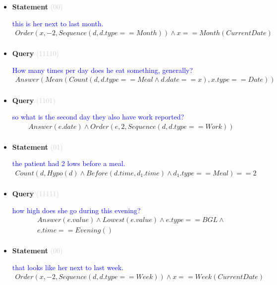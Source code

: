 \documentclass[11pt]{article}
\newcommand{\key}[1]{\textcolor{lightgray}{#1}}
\newcounter{CQuery}
\newcounter{CStatement}
\begin{document}
\begin{itemize}
\item
\textbf{Statement\theCStatement} \key{(00)} \addtocounter{CStatement}{1}
\textcolor{blue}{ this is her next to last month. }
\begin{multline*}
Order(x, -2, Sequence(d, d.type==Month)) \wedge x==Month(CurrentDate) \\ 
\end{multline*}


\item
\textbf{Query\theCQuery} \key{(11110)} \addtocounter{CQuery}{1}
\textcolor{blue}{ How many times per day does he eat something, generally? }
\begin{multline*}
Answer(Mean(Count(d, d.type==Meal \wedge d.date==x), x.type==Date)) \\ 
\end{multline*}


\item
\textbf{Query\theCQuery} \key{(1101)} \addtocounter{CQuery}{1}
\textcolor{blue}{ so what is the second day they also have work reported? }
\begin{multline*}
Answer(e.date) \wedge Order(e, 2, Sequence(d, d.type==Work)) \\ 
\end{multline*}


\item
\textbf{Statement\theCStatement} \key{(01)} \addtocounter{CStatement}{1}
\textcolor{blue}{ the patient had 2 lows before a meal. }
\begin{multline*}
Count(d, Hypo(d) \wedge Before(d.time, d_1.time) \wedge d_1.type==Meal)==2 \\ 
\end{multline*}


\item
\textbf{Query\theCQuery} \key{(11111)} \addtocounter{CQuery}{1}
\textcolor{blue}{ how high does she go during this evening? }
\begin{multline*}
Answer(e.value) \wedge Lowest(e.value) \wedge e.type==BGL \wedge \\ 
e.time==Evening() \\ 
\end{multline*}


\item
\textbf{Statement\theCStatement} \key{(00)} \addtocounter{CStatement}{1}
\textcolor{blue}{ that looks like her next to last week. }
\begin{multline*}
Order(x, -2, Sequence(d, d.type==Week)) \wedge x==Week(CurrentDate) \\ 
\end{multline*}



\end{itemize}
\end{document}
